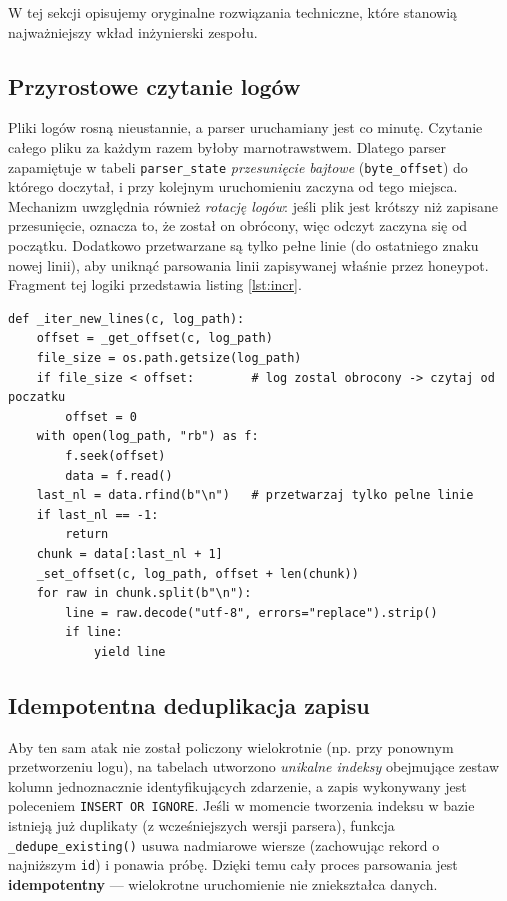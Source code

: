 \documentclass[12pt,a4paper]{report}
\begin{document}
W tej sekcji opisujemy oryginalne rozwiązania techniczne, które stanowią
najważniejszy wkład inżynierski zespołu.

\subsection{Przyrostowe czytanie logów}

Pliki logów rosną nieustannie, a parser uruchamiany jest co minutę. Czytanie
całego pliku za każdym razem byłoby marnotrawstwem. Dlatego parser zapamiętuje
w tabeli \texttt{parser\_state} \emph{przesunięcie bajtowe} (\texttt{byte\_offset})
do którego doczytał, i przy kolejnym uruchomieniu zaczyna od tego miejsca.
Mechanizm uwzględnia również \emph{rotację logów}: jeśli plik jest krótszy niż
zapisane przesunięcie, oznacza to, że został on obrócony, więc odczyt zaczyna
się od początku. Dodatkowo przetwarzane są tylko pełne linie (do ostatniego
znaku nowej linii), aby uniknąć parsowania linii zapisywanej właśnie przez
honeypot. Fragment tej logiki przedstawia listing \ref{lst:incr}.

\begin{lstlisting}[style=py,caption={Przyrostowe czytanie nowych linii logu (fragment).},label={lst:incr}]
def _iter_new_lines(c, log_path):
    offset = _get_offset(c, log_path)
    file_size = os.path.getsize(log_path)
    if file_size < offset:        # log zostal obrocony -> czytaj od poczatku
        offset = 0
    with open(log_path, "rb") as f:
        f.seek(offset)
        data = f.read()
    last_nl = data.rfind(b"\n")   # przetwarzaj tylko pelne linie
    if last_nl == -1:
        return
    chunk = data[:last_nl + 1]
    _set_offset(c, log_path, offset + len(chunk))
    for raw in chunk.split(b"\n"):
        line = raw.decode("utf-8", errors="replace").strip()
        if line:
            yield line
\end{lstlisting}

\subsection{Idempotentna deduplikacja zapisu}

Aby ten sam atak nie został policzony wielokrotnie (np. przy ponownym
przetworzeniu logu), na tabelach utworzono \emph{unikalne indeksy} obejmujące
zestaw kolumn jednoznacznie identyfikujących zdarzenie, a zapis wykonywany jest
poleceniem \texttt{INSERT OR IGNORE}. Jeśli w momencie tworzenia indeksu w bazie
istnieją już duplikaty (z wcześniejszych wersji parsera), funkcja
\texttt{\_dedupe\_existing()} usuwa nadmiarowe wiersze (zachowując rekord
o najniższym \texttt{id}) i ponawia próbę. Dzięki temu cały proces parsowania
jest \textbf{idempotentny} --- wielokrotne uruchomienie nie zniekształca danych.
\end{document}
